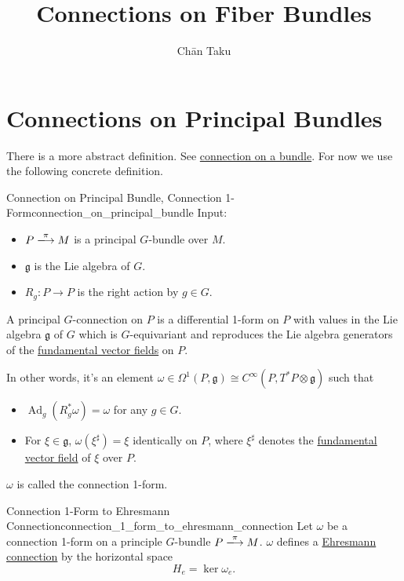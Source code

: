 \documentclass{article}
\title{Connections on Fiber Bundles}
\author{Ch\=an Taku}
\begin{document}
\maketitle

\section{Connections on Principal Bundles}

There is a more abstract definition.
See \href{https://ncatlab.org/nlab/show/connection+on+a+bundle}{connection on a bundle}.
For now we use the following concrete definition.

\begin{definition}{Connection on Principal Bundle, Connection 1-Form}{connection_on_principal_bundle}
    Input:
    \begin{itemize}
        \item $P\xlongrightarrow{\pi} M$ is a principal $G$-bundle over $M$.
        \item $\mathfrak{g}$ is the Lie algebra of $G$.
        \item $R_g: P\rightarrow P$ is the right action by $g\in G$.
    \end{itemize}
    A principal $G$-connection on $P$ is a
    differential 1-form on $P$
    with values in the Lie algebra $\mathfrak{g}$ of $G$
    which is $G$-equivariant
    and reproduces the Lie algebra generators of the \hyperref[Lie-def:fundamental_vector_field]{fundamental vector fields} on $P$.
    \par
    In other words, it's an element $\omega\in \Omega^1(P,\mathfrak{g}) \cong C^\infty(P, T^*P \otimes \mathfrak{g})$ such that
    \begin{itemize}
        \item $\operatorname{Ad}_g(R^*_g \omega) = \omega$ for any $g\in G$.
        \item For $\xi\in\mathfrak{g}$, $\omega(\xi^\sharp) = \xi$ identically on $P$,
        where $\xi^\sharp$ denotes the \hyperref[Lie-def:fundamental_vector_field]{fundamental vector field} of $\xi$ over $P$.
    \end{itemize}
    $\omega$ is called the connection 1-form.
\end{definition}

\begin{proposition}{Connection 1-Form to Ehresmann Connection}{connection_1_form_to_ehresmann_connection}
    Let $\omega$ be a connection 1-form on a principle $G$-bundle $P\xlongrightarrow{\pi} M$.
    $\omega$ defines a \hyperref[Fib-def:ehresmann_connection]{Ehresmann connection} by the horizontal space
    \[ H_e = \ker \omega_e. \]
\end{proposition}
\end{document}
